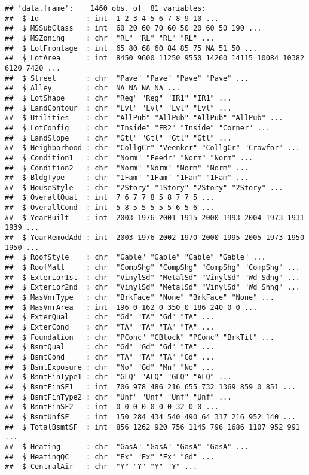 \documentclass[]{article}
\begin{document}
\begin{verbatim}
## 'data.frame':    1460 obs. of  81 variables:
##  $ Id           : int  1 2 3 4 5 6 7 8 9 10 ...
##  $ MSSubClass   : int  60 20 60 70 60 50 20 60 50 190 ...
##  $ MSZoning     : chr  "RL" "RL" "RL" "RL" ...
##  $ LotFrontage  : int  65 80 68 60 84 85 75 NA 51 50 ...
##  $ LotArea      : int  8450 9600 11250 9550 14260 14115 10084 10382 6120 7420 ...
##  $ Street       : chr  "Pave" "Pave" "Pave" "Pave" ...
##  $ Alley        : chr  NA NA NA NA ...
##  $ LotShape     : chr  "Reg" "Reg" "IR1" "IR1" ...
##  $ LandContour  : chr  "Lvl" "Lvl" "Lvl" "Lvl" ...
##  $ Utilities    : chr  "AllPub" "AllPub" "AllPub" "AllPub" ...
##  $ LotConfig    : chr  "Inside" "FR2" "Inside" "Corner" ...
##  $ LandSlope    : chr  "Gtl" "Gtl" "Gtl" "Gtl" ...
##  $ Neighborhood : chr  "CollgCr" "Veenker" "CollgCr" "Crawfor" ...
##  $ Condition1   : chr  "Norm" "Feedr" "Norm" "Norm" ...
##  $ Condition2   : chr  "Norm" "Norm" "Norm" "Norm" ...
##  $ BldgType     : chr  "1Fam" "1Fam" "1Fam" "1Fam" ...
##  $ HouseStyle   : chr  "2Story" "1Story" "2Story" "2Story" ...
##  $ OverallQual  : int  7 6 7 7 8 5 8 7 7 5 ...
##  $ OverallCond  : int  5 8 5 5 5 5 5 6 5 6 ...
##  $ YearBuilt    : int  2003 1976 2001 1915 2000 1993 2004 1973 1931 1939 ...
##  $ YearRemodAdd : int  2003 1976 2002 1970 2000 1995 2005 1973 1950 1950 ...
##  $ RoofStyle    : chr  "Gable" "Gable" "Gable" "Gable" ...
##  $ RoofMatl     : chr  "CompShg" "CompShg" "CompShg" "CompShg" ...
##  $ Exterior1st  : chr  "VinylSd" "MetalSd" "VinylSd" "Wd Sdng" ...
##  $ Exterior2nd  : chr  "VinylSd" "MetalSd" "VinylSd" "Wd Shng" ...
##  $ MasVnrType   : chr  "BrkFace" "None" "BrkFace" "None" ...
##  $ MasVnrArea   : int  196 0 162 0 350 0 186 240 0 0 ...
##  $ ExterQual    : chr  "Gd" "TA" "Gd" "TA" ...
##  $ ExterCond    : chr  "TA" "TA" "TA" "TA" ...
##  $ Foundation   : chr  "PConc" "CBlock" "PConc" "BrkTil" ...
##  $ BsmtQual     : chr  "Gd" "Gd" "Gd" "TA" ...
##  $ BsmtCond     : chr  "TA" "TA" "TA" "Gd" ...
##  $ BsmtExposure : chr  "No" "Gd" "Mn" "No" ...
##  $ BsmtFinType1 : chr  "GLQ" "ALQ" "GLQ" "ALQ" ...
##  $ BsmtFinSF1   : int  706 978 486 216 655 732 1369 859 0 851 ...
##  $ BsmtFinType2 : chr  "Unf" "Unf" "Unf" "Unf" ...
##  $ BsmtFinSF2   : int  0 0 0 0 0 0 0 32 0 0 ...
##  $ BsmtUnfSF    : int  150 284 434 540 490 64 317 216 952 140 ...
##  $ TotalBsmtSF  : int  856 1262 920 756 1145 796 1686 1107 952 991 ...
##  $ Heating      : chr  "GasA" "GasA" "GasA" "GasA" ...
##  $ HeatingQC    : chr  "Ex" "Ex" "Ex" "Gd" ...
##  $ CentralAir   : chr  "Y" "Y" "Y" "Y" ...

\end{verbatim}
\end{document}
